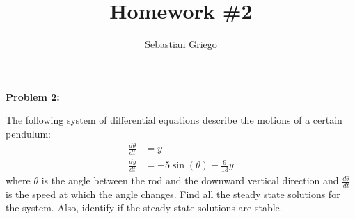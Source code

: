 \documentclass[12pt]{article}
\newenvironment{problem}[1]{
    \textbf{Problem #1:}
}{
    \rmfamily \vspace{1em}
}
\begin{document}
\title{Homework \#2}  %
\author{Sebastian Griego}  %

\begin{problem}{2}
    The following system of differential equations describe the motions of a certain pendulum:
    \[
        \begin{aligned}
            \frac{d\theta}{dt} &= y \\
            \frac{dy}{dt} &= -5\sin(\theta) - \frac{9}{13}y
        \end{aligned}
    \]
    where \(\theta\) is the angle between the rod and the downward vertical direction and \(\frac{d\theta}{dt}\) is the speed at which the angle changes. Find all the steady state solutions for the system. Also, identify if the steady state solutions are stable.
\end{problem}
\end{document}
